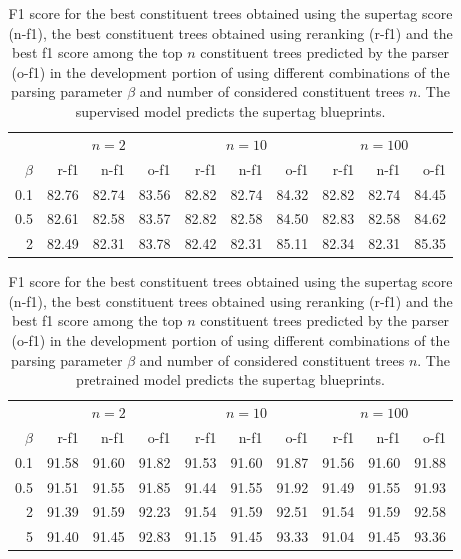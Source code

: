 \documentclass[../../document.tex]{subfiles}
\begin{document}
    \begin{table}
        \caption{\label{tbl:grid:reranking:supervised}
        F1 score for the best constituent trees obtained using the supertag score (n-f1), the best constituent trees obtained using reranking (r-f1) and the best f1 score among the top $n$ constituent trees predicted by the parser (o-f1) in the development portion of \negra{} using different combinations of the parsing parameter $\beta$ and number of considered constituent trees $n$. The supervised model predicts the supertag blueprints.
        }
        \centering
        \vspace{.2cm}
        \begin{tabular}{r|rrr|rrr|rrr}
            \toprule
       & \multicolumn{3}{c|}{$n = 2$} & \multicolumn{3}{c|}{$n = 10$}& \multicolumn{3}{c}{$n = 100$}\\
 \(\beta\) & r-f1 & n-f1 & o-f1  & r-f1 & n-f1 & o-f1 & r-f1 & n-f1 & o-f1   \\
\hline 
0.1 & 82.76 & 82.74 & 83.56 & 82.82 & 82.74 & 84.32 & 82.82 & 82.74 & 84.45 \\
0.5 & 82.61 & 82.58 & 83.57 & 82.82 & 82.58 & 84.50 & 82.83 & 82.58 & 84.62 \\
  2 & 82.49 & 82.31 & 83.78 & 82.42 & 82.31 & 85.11 & 82.34 & 82.31 & 85.35 \\
\bottomrule
        \end{tabular}
    \end{table}

    \begin{table}
        \caption{\label{tbl:grid:reranking:pretrained}
        F1 score for the best constituent trees obtained using the supertag score (n-f1), the best constituent trees obtained using reranking (r-f1) and the best f1 score among the top $n$ constituent trees predicted by the parser (o-f1) in the development portion of \negra{} using different combinations of the parsing parameter $\beta$ and number of considered constituent trees $n$. The pretrained model predicts the supertag blueprints.
        }
        \centering
        \vspace{.2cm}
        \begin{tabular}{r|rrr|rrr|rrr}
            \toprule
       & \multicolumn{3}{c|}{$n = 2$} & \multicolumn{3}{c|}{$n = 10$}& \multicolumn{3}{c}{$n = 100$}\\
 \(\beta\) & r-f1 & n-f1 & o-f1  & r-f1 & n-f1 & o-f1 & r-f1 & n-f1 & o-f1   \\
\hline 
0.1 & 91.58 & 91.60 & 91.82 & 91.53 & 91.60 & 91.87 & 91.56 & 91.60 & 91.88\\
0.5 & 91.51 & 91.55 & 91.85 & 91.44 & 91.55 & 91.92 & 91.49 & 91.55 & 91.93 \\
  2 & 91.39 & 91.59 & 92.23 & 91.54 & 91.59 & 92.51 & 91.54 & 91.59 & 92.58 \\
  5 & 91.40 & 91.45 & 92.83 & 91.15 & 91.45 & 93.33 & 91.04 & 91.45 & 93.36 \\
\bottomrule
        \end{tabular}
    \end{table}
\end{document}
